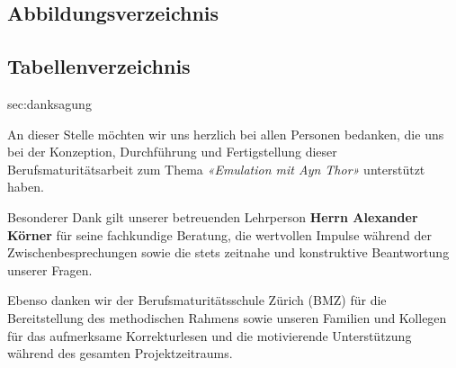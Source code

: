 \documentclass[12pt,a4paper]{scrartcl}
\begin{document}
\vspace{0.6cm}

\subsection{Abbildungsverzeichnis}
\label{sec:abbildungsverzeichnis}
\begingroup
\renewcommand{\section}[2]{}
\listoffigures
\endgroup

\vspace{0.6cm}

\subsection{Tabellenverzeichnis}
\label{sec:tabellenverzeichnis}
\begingroup
\renewcommand{\section}[2]{}
\listoftables
\endgroup

\newpage

\section{Danksagung}
\label{sec:danksagung}

An dieser Stelle möchten wir uns herzlich bei allen Personen bedanken, die uns bei der Konzeption, Durchführung und Fertigstellung dieser Berufsmaturitätsarbeit zum Thema \textit{«Emulation mit Ayn Thor»} unterstützt haben.

Besonderer Dank gilt unserer betreuenden Lehrperson \textbf{Herrn Alexander Körner} für seine fachkundige Beratung, die wertvollen Impulse während der Zwischenbesprechungen sowie die stets zeitnahe und konstruktive Beantwortung unserer Fragen.

Ebenso danken wir der Berufsmaturitätsschule Zürich (BMZ) für die Bereitstellung des methodischen Rahmens sowie unseren Familien und Kollegen für das aufmerksame Korrekturlesen und die motivierende Unterstützung während des gesamten Projektzeitraums.

\newpage

\end{document}
